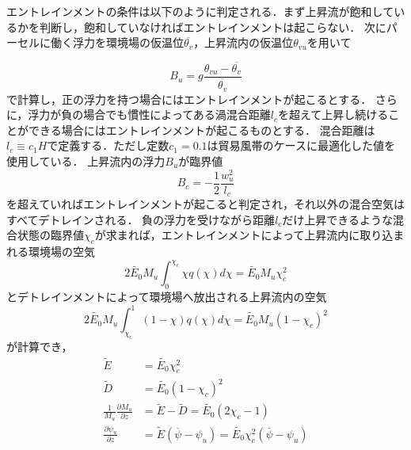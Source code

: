 \documentclass[platex, dvipdfmx]{jsarticle}
\begin{document}

エントレインメントの条件は以下のように判定される．まず上昇流が飽和しているかを判断し，飽和していなければエントレインメントは起こらない．
次にパーセルに働く浮力を環境場の仮温位$\overline{\theta_v}$，上昇流内の仮温位$\theta_{vu}$を用いて

\begin{equation}
    B_u = g\frac{\theta_{vu} - \overline{\theta_{v}}}{ \overline{\theta_v}}
\end{equation}
で計算し，正の浮力を持つ場合にはエントレインメントが起こるとする．
さらに，浮力が負の場合でも慣性によってある渦混合距離$l_c$を超えて上昇し続けることができる場合にはエントレインメントが起こるものとする．
混合距離は$l_c \equiv c_1 H$で定義する．ただし定数$c_1=0.1$は貿易風帯のケースに最適化した値を使用している．
上昇流内の浮力$B_u$が臨界値
\begin{equation}
    B_c = -\frac{1}{2}\frac{w_u^2}{l_c}    
\end{equation}
を超えていればエントレインメントが起こると判定され，それ以外の混合空気はすべてデトレインされる．
負の浮力を受けながら距離$l_c$だけ上昇できるような混合状態の臨界値$\chi_c$が求まれば，エントレインメントによって上昇流内に取り込まれる環境場の空気
\begin{equation}
    2\tilde{E_0} M_u\int_0^{\chi_c}\chi q(\chi) d\chi = \tilde{E_0} M_u \chi_c^2    
\end{equation}
とデトレインメントによって環境場へ放出される上昇流内の空気
\begin{equation}
    2\tilde{E_0} M_u\int_{\chi_c}^{1}(1-\chi) q(\chi) d\chi = \tilde{E_0} M_u (1-\chi_c)^2    
\end{equation}
が計算でき，
\begin{align}
    \tilde{E}&=\tilde{E_0}\chi_c^2 \\
    \tilde{D}&=\tilde{E_0}(1-\chi_c)^2 \\
    \frac{1}{M_u}\frac{\partial M_u}{\partial z} &= \tilde{E} - \tilde{D} = \tilde{E_0}(2\chi_c - 1) \label{M_u}\\
    \frac{\partial \psi_u}{\partial z} &= \tilde{E} (\overline{\psi}-\psi_u) = \tilde{E_0}\chi_c^2(\overline{\psi}-\psi_u) \label{psi_u}\\
\end{align}
\end{document}
